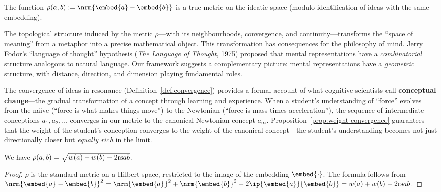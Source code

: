\begin{corollary}
\label{cor:true-metric}
The function $\rho(a, b) := \nrm{\embed{a} - \embed{b}}$ is a true metric
on the ideatic space (modulo identification of ideas with the same embedding).

\begin{interpretation}
\label{interp:ch11:topology_meaning}
The topological structure induced by the metric $\rho$---with its
neighbourhoods, convergence, and continuity---transforms the ``space of
meaning'' from a metaphor into a precise mathematical object.  This
transformation has consequences for the philosophy of mind.  Jerry Fodor's
``language of thought'' hypothesis (\emph{The Language of Thought}, 1975)
proposed that mental representations have a \emph{combinatorial} structure
analogous to natural language.  Our framework suggests a complementary
picture: mental representations have a \emph{geometric} structure, with
distance, direction, and dimension playing fundamental roles.

The convergence of ideas in resonance (Definition~\ref{def:convergence})
provides a formal account of what cognitive scientists call
\textbf{conceptual change}---the gradual transformation of a concept
through learning and experience.  When a student's understanding of
``force'' evolves from the na\"{\i}ve (``force is what makes things move'')
to the Newtonian (``force is mass times acceleration''), the sequence
of intermediate conceptions $a_1, a_2, \ldots$ converges in our metric
to the canonical Newtonian concept $a_{\infty}$.
Proposition~\ref{prop:weight-convergence} guarantees that the weight of
the student's conception converges to the weight of the canonical
concept---the student's understanding becomes not just directionally closer
but \emph{equally rich} in the limit.
\end{interpretation}


We have $\rho(a,b) = \sqrt{w(a) + w(b) - 2\mathrm{rs}{a}{b}}$.
\end{corollary}

\begin{proof}
$\rho$ is the standard metric on a Hilbert space, restricted to the image
of the embedding $\embed{\cdot}$.  The formula follows from
$\nrm{\embed{a} - \embed{b}}^2 = \nrm{\embed{a}}^2 + \nrm{\embed{b}}^2
- 2\ip{\embed{a}}{\embed{b}} = w(a) + w(b) - 2\rs{a}{b}$.
\end{proof}

